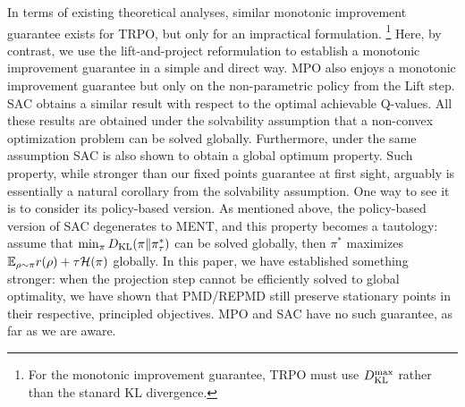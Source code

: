 In terms of existing theoretical analyses, 
similar monotonic improvement guarantee exists for TRPO, but only for an
impractical formulation.%
%
\footnote{
	For the monotonic improvement guarantee,
	TRPO must use $D_{\mathrm{KL}}^{\max} $ rather than the stanard KL divergence.
} 
Here, by contrast,
we use the lift-and-project reformulation to establish a monotonic
improvement guarantee in a simple and direct way.
MPO also enjoys a monotonic
improvement guarantee but only on the non-parametric policy from the Lift step.
SAC obtains a similar result with respect to the optimal achievable
Q-values.
All these results are obtained under the solvability assumption that a non-convex optimization problem can be solved globally.
Furthermore, under the same assumption SAC is also shown to obtain a global optimum property. 
Such property, while stronger than our fixed points guarantee at first sight, arguably is essentially a natural corollary from the solvability assumption.
One way to see it is to consider its policy-based version.
As mentioned above, the policy-based version of SAC degenerates to MENT,
and this property becomes a tautology: assume that $\min_\pi D_{\mathrm{KL}}(\pi \| \pi^*_\tau)$ can be solved globally, then $\pi^*$ maximizes $\mathbb{E}_{\rho \sim \pi} r(\rho) + \tau \mathcal{H}(\pi)$  globally.
In this paper, we have established something stronger:
when the projection step cannot be efficiently solved to global optimality,
we have shown that PMD/REPMD still preserve stationary points in 
their respective, principled objectives.
MPO and SAC have no such guarantee, as far as we are aware. 

